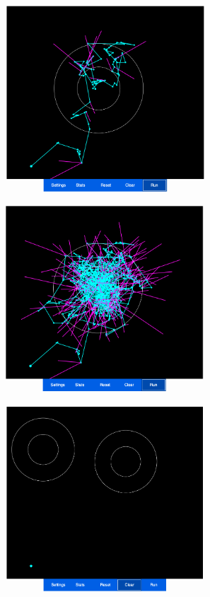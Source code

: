 \documentclass[
  letterpaper,
  DIV=11,
  numbers=noendperiod]{scrartcl}
\begin{document}
\framebreak

\begin{center}
  \includegraphics[height=7cm]{../graphics/mcmc-demo2.png}
\end{center}

\framebreak

\begin{center}
  \includegraphics[height=7cm]{../graphics/mcmc-demo3.png}
\end{center}

\framebreak

\begin{center}
  \includegraphics[height=7cm]{../graphics/mcmc-demo4.png}
\end{center}
\end{document}
